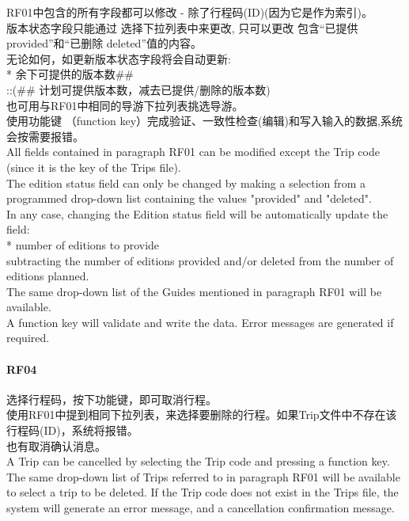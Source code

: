 RF01中包含的所有字段都可以修改 - 除了行程码(ID)(因为它是作为索引)。\\
版本状态字段只能通过 选择下拉列表中来更改, 只可以更改 包含``已提供
provided''和``已删除 deleted''值的内容。\\
无论如何，如更新版本状态字段将会自动更新:\\
* 余下可提供的版本数\#\#\\
::(\#\# 计划可提供版本数，减去已提供/删除的版本数)\\
也可用与RF01中相同的导游下拉列表挑选导游。\\
使用功能键 （function
key）完成验证、一致性检查(编辑)和写入输入的数据,系统会按需要报错。\\
All fields contained in paragraph RF01 can be modified except the Trip
code (since it is the key of the Trips file).\\
The edition status field can only be changed by making a selection from
a programmed drop-down list containing the values "provided" and
"deleted".\\
In any case, changing the Edition status field will be automatically
update the field:\\
* number of editions to provide\\
subtracting the number of editions provided and/or deleted from the
number of editions planned.\\
The same drop-down list of the Guides mentioned in paragraph RF01 will
be available.\\
A function key will validate and write the data. Error messages are
generated if required.\\

\hypertarget{rf04-2}{%
\paragraph{RF04}\label{rf04-2}}

选择行程码，按下功能键，即可取消行程。\\
使用RF01中提到相同下拉列表，来选择要删除的行程。如果Trip文件中不存在该行程码(ID)，系统将报错。\\
也有取消确认消息。\\
A Trip can be cancelled by selecting the Trip code and pressing a
function key.\\
The same drop-down list of Trips referred to in paragraph RF01 will be
available to select a trip to be deleted. If the Trip code does not
exist in the Trips file, the system will generate an error message, and
a cancellation confirmation message.\\

